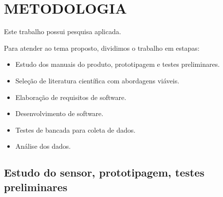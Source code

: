 \chapter{METODOLOGIA}\label{chap:metodologia}

Este trabalho possui pesquisa aplicada.

Para atender ao tema proposto, dividimos o trabalho em estapas:
\begin{itemize}
    \item Estudo dos manuais do produto, prototipagem e testes preliminares.
    \item Seleção de literatura científica com abordagens viáveis.
    \item Elaboração de requisitos de software.
    \item Desenvolvimento de software.
    \item Testes de bancada para coleta de dados.
    \item Análise dos dados.
\end{itemize}

\section{Estudo do sensor, prototipagem, testes preliminares}

